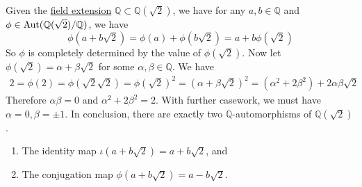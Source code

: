  \begin{example}
    \label{ex:computing-autqsqrt2q}
    Given the \hyperref[def:field-extension]{field extension} $\mathbb{Q} \subset \mathbb{Q}(\sqrt{2})$, we have for any $a, b \in \mathbb{Q}$ and $\phi \in \operatorname{Aut}(\mathbb{Q}(\sqrt{2})/\mathbb{Q})$, we have 
    \begin{equation}
      \phi(a + b \sqrt{2}) = \phi(a) + \phi(b \sqrt{2}) = a + b \phi(\sqrt{2}) 
    \end{equation}
    So $\phi$ is completely determined by the value of $\phi(\sqrt{2})$. Now let $\phi(\sqrt{2}) = \alpha + \beta \sqrt{2}$ for some $\alpha, \beta \in \mathbb{Q}$. We have 
    \begin{align}
      2 = \phi(2) = \phi(\sqrt{2} \sqrt{2}) = \phi(\sqrt{2})^2 = (\alpha + \beta\sqrt{2})^2 = (\alpha^2 + 2 \beta^2) + 2 \alpha \beta \sqrt{2} 
    \end{align}
    Therefore $\alpha \beta = 0$ and $\alpha^2 + 2 \beta^2 = 2$. With further casework, we must have $\alpha = 0, \beta = \pm 1$. In conclusion, there are exactly two $\mathbb{Q}$-automorphisms of $\mathbb{Q}(\sqrt{2})$. 
    \begin{enumerate}
      \item The identity map $\iota(a + b \sqrt{2}) = a + b \sqrt{2}$, and 
      \item The conjugation map $\phi(a + b \sqrt{2}) = a - b \sqrt{2}$. 
    \end{enumerate}
  \end{example}

